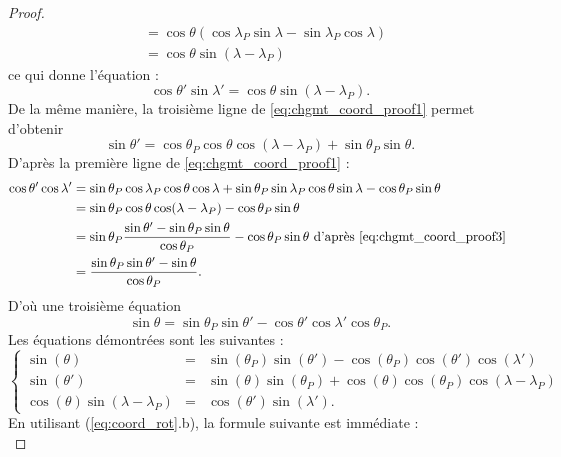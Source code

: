 \begin{proof}
\begin{align*}
	& = \cos \theta ( \cos \lambda_P \sin \lambda - \sin \lambda_P \cos \lambda) \\
	& = \cos \theta \sin (\lambda - \lambda_P)
\end{align*}
ce qui donne l'équation :
\begin{equation}
\cos \theta' \sin \lambda' = \cos \theta \sin (\lambda - \lambda_P).
\label{eq:chgmt_coord_proof2}
\end{equation}
De la même manière, la troisième ligne de \eqref{eq:chgmt_coord_proof1} permet d'obtenir
\begin{equation}
\sin \theta' = \cos \theta_P \cos \theta \cos (\lambda - \lambda_P) + \sin \theta_P \sin \theta .
\label{eq:chgmt_coord_proof3}
\end{equation}
D'après la première ligne de \eqref{eq:chgmt_coord_proof1} :
\begin{align*}
\cos \theta' \cos \lambda' & = \sin \theta_P \cos \lambda_P \cos \theta \cos \lambda + \sin \theta_P \sin \lambda_P \cos \theta \sin \lambda - \cos \theta_P \sin \theta \\
	& = \sin \theta_P \cos \theta \cos ( \lambda - \lambda_P) - \cos \theta_P \sin \theta \\
	& = \sin \theta_P \dfrac{\sin \theta' - \sin \theta_P \sin \theta}{\cos \theta_P} - \cos \theta_P \sin \theta \text{ d'après \eqref{eq:chgmt_coord_proof3} } \\
	& = \dfrac{\sin \theta_P \sin \theta' - \sin \theta}{\cos \theta_P}.
\end{align*}
D'où une troisième équation
\begin{equation}
\sin \theta = \sin \theta_P \sin \theta' - \cos \theta' \cos \lambda' \cos \theta_P .
\label{eq:chgmt_coord_proof4}
\end{equation}
Les équations démontrées sont les suivantes :
\begin{equation}
\label{eq:coord_rot}
\left\lbrace 
\begin{array}{rcl}
\sin ( \theta ) & = & \sin( \theta_P) \sin( \theta') - \cos( \theta_P) \cos( \theta') \cos( \lambda' ) \\
\sin( \theta' ) & = & \sin( \theta) \sin(\theta_P) + \cos( \theta ) \cos( \theta_P) \cos( \lambda - \lambda_P ) \\
\cos( \theta ) \sin( \lambda - \lambda_P) & = & \cos( \theta' ) \sin( \lambda' ).
\end{array}
\right.
\end{equation}
En utilisant (\ref{eq:coord_rot}.b), la formule suivante est immédiate :
\begin{equation}

\end{equation}
\end{proof}
